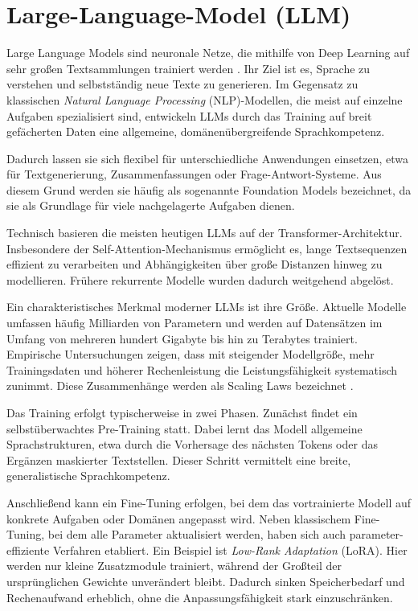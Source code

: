 \section{Large-Language-Model (LLM)}
Large Language Models sind neuronale Netze, die mithilfe von Deep Learning auf sehr großen Textsammlungen trainiert werden \cite{Zhao2023}. Ihr Ziel ist es, Sprache zu verstehen und selbstständig neue Texte zu generieren. Im Gegensatz zu klassischen \textit{Natural Language Processing} (NLP)-Modellen, die meist auf einzelne Aufgaben spezialisiert sind, entwickeln LLMs durch das Training auf breit gefächerten Daten eine allgemeine, domänenübergreifende Sprachkompetenz.

Dadurch lassen sie sich flexibel für unterschiedliche Anwendungen einsetzen, etwa für Textgenerierung, Zusammenfassungen oder Frage-Antwort-Systeme. Aus diesem Grund werden sie häufig als sogenannte Foundation Models bezeichnet, da sie als Grundlage für viele nachgelagerte Aufgaben dienen.

Technisch basieren die meisten heutigen LLMs auf der Transformer-Architektur. Insbesondere der Self-Attention-Mechanismus ermöglicht es, lange Textsequenzen effizient zu verarbeiten und Abhängigkeiten über große Distanzen hinweg zu modellieren. Frühere rekurrente Modelle wurden dadurch weitgehend abgelöst.

Ein charakteristisches Merkmal moderner LLMs ist ihre Größe. Aktuelle Modelle umfassen häufig Milliarden von Parametern und werden auf Datensätzen im Umfang von mehreren hundert Gigabyte bis hin zu Terabytes trainiert. Empirische Untersuchungen zeigen, dass mit steigender Modellgröße, mehr Trainingsdaten und höherer Rechenleistung die Leistungsfähigkeit systematisch zunimmt. Diese Zusammenhänge werden als Scaling Laws bezeichnet \cite{Brown2020}.

Das Training erfolgt typischerweise in zwei Phasen. Zunächst findet ein selbstüberwachtes Pre-Training statt. Dabei lernt das Modell allgemeine Sprachstrukturen, etwa durch die Vorhersage des nächsten Tokens oder das Ergänzen maskierter Textstellen. Dieser Schritt vermittelt eine breite, generalistische Sprachkompetenz.

Anschließend kann ein Fine-Tuning erfolgen, bei dem das vortrainierte Modell auf konkrete Aufgaben oder Domänen angepasst wird. Neben klassischem Fine-Tuning, bei dem alle Parameter aktualisiert werden, haben sich auch parameter-effiziente Verfahren etabliert. Ein Beispiel ist \textit{Low-Rank Adaptation} (LoRA). Hier werden nur kleine Zusatzmodule trainiert, während der Großteil der ursprünglichen Gewichte unverändert bleibt. Dadurch sinken Speicherbedarf und Rechenaufwand erheblich, ohne die Anpassungsfähigkeit stark einzuschränken.

